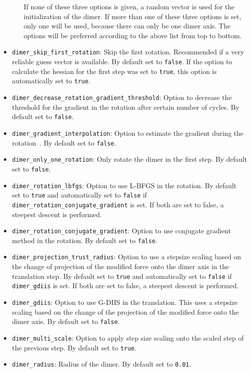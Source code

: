 \documentclass[]{tufte-book}
\begin{document}
\begin{itemize}
\begin{itemize}
If none of these three options is given, a random vector is used for the initialization of the dimer. If more than one of these three options is set, only one will be used, because there can only be one dimer axis. The options will be preferred according to the above list from top to bottom.
\end{itemize}
\item \texttt{dimer\_skip\_first\_rotation}: Skip the first rotation. Recommended if a very reliable guess vector is available. By default set to \texttt{false}. If the option to calculate the hessian for the first step was set to \texttt{true}, this option is automatically set to \texttt{true}.
\item \texttt{dimer\_decrease\_rotation\_gradient\_threshold}: Option to decrease the threshold for the gradient in the rotation after certain number of cycles. By default set to \texttt{false}.
\item \texttt{dimer\_gradient\_interpolation}: Option to estimate the gradient during the rotation~\cite{dimer2}. By default set to \texttt{false}.
\item \texttt{dimer\_only\_one\_rotation}: Only rotate the dimer in the first step. By default set to \texttt{false}.
\item \texttt{dimer\_rotation\_lbfgs}: Option to use L-BFGS in the rotation. By default set to \texttt{true} and automatically set to \texttt{false} if \texttt{dimer\_rotation\_conjugate\_gradient} is set. If both are set to false, a steepest descent is performed.
\item \texttt{dimer\_rotation\_conjugate\_gradient}: Option to use conjugate gradient method in the rotation. By default set to \texttt{false}.
\item \texttt{dimer\_projection\_trust\_radius}: Option to use a stepsize scaling based on the change of projection of the modified force onto the dimer axis in the translation step. By default set to \texttt{true} and automatically set to \texttt{false} if \texttt{dimer\_gdiis} is set. If both are set to false, a steepest descent is performed.
\item \texttt{dimer\_gdiis}: Option to use G-DIIS in the translation. This uses a stepsize scaling based on the change of the projection of the modified force onto the dimer axis. By default set to \texttt{false}.
\item \texttt{dimer\_multi\_scale}: Option to apply step size scaling onto the scaled step of the previous step. By default set to \texttt{true}.
\item \texttt{dimer\_radius}: Radius of the dimer. By default set to \texttt{0.01}.

\end{itemize}
\end{document}

